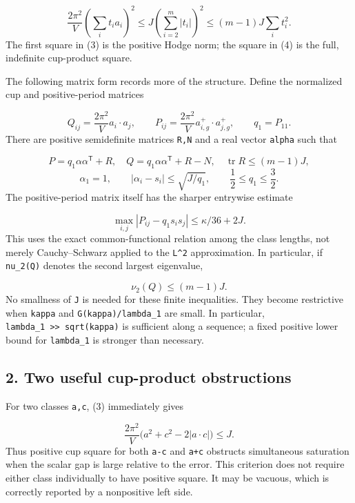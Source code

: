 \documentclass[
  11pt,
]{article}
\begin{document}
\[
 \boxed{\frac{2\pi^2}{V}\left(\sum_i t_i a_i\right)^2
       \le J\left(\sum_{i=2}^m|t_i|\right)^2
       \le(m-1)J\sum_i t_i^2.}
 \tag{4}
\] The first square in (3) is the positive Hodge norm; the square in (4)
is the full, indefinite cup-product square.

The following matrix form records more of the structure. Define the
normalized cup and positive-period matrices

\[
 Q_{ij}=\frac{2\pi^2}{V}a_i\cdot a_j,\qquad
 P_{ij}=\frac{2\pi^2}{V}a_{i,g}^+\cdot a_{j,g}^+,
 \qquad q_1=P_{11}.
\] There are positive semidefinite matrices \texttt{R,N} and a real
vector \texttt{alpha} such that

\[
 \boxed{P=q_1\alpha\alpha^{\mathsf T}+R,
 \quad Q=q_1\alpha\alpha^{\mathsf T}+R-N,
 \quad \operatorname{tr}R\le(m-1)J,}
 \tag{5}
\] \[
 \alpha_1=1,\qquad
 |\alpha_i-s_i|\le\sqrt{J/q_1},\qquad
 \frac12\le q_1\le\frac32.
 \tag{6}
\] The positive-period matrix itself has the sharper entrywise estimate

\[
 \boxed{\max_{i,j}|P_{ij}-q_1s_i s_j|\le\kappa/36+2J.}
 \tag{6a}
\] This uses the exact common-functional relation among the class
lengths, not merely Cauchy--Schwarz applied to the \texttt{L\^{}2}
approximation. In particular, if \texttt{nu\_2(Q)} denotes the second
largest eigenvalue,

\[
 \boxed{\nu_2(Q)\le(m-1)J.}
 \tag{7}
\] No smallness of \texttt{J} is needed for these finite inequalities.
They become restrictive when \texttt{kappa} and
\texttt{G(kappa)/lambda\_1} are small. In particular,
\texttt{lambda\_1\ \textgreater{}\textgreater{}\ sqrt(kappa)} is
sufficient along a sequence; a fixed positive lower bound for
\texttt{lambda\_1} is stronger than necessary.

\hypertarget{two-useful-cup-product-obstructions}{%
\subsection{2. Two useful cup-product
obstructions}\label{two-useful-cup-product-obstructions}}

For two classes \texttt{a,c}, (3) immediately gives

\[
 \boxed{\frac{2\pi^2}{V}
       \bigl(a^2+c^2-2|a\cdot c|\bigr)\le J.}
 \tag{8}
\] Thus positive cup square for both \texttt{a-c} and \texttt{a+c}
obstructs simultaneous saturation when the scalar gap is large relative
to the error. This criterion does not require either class individually
to have positive square. It may be vacuous, which is correctly reported
by a nonpositive left side.
\end{document}
